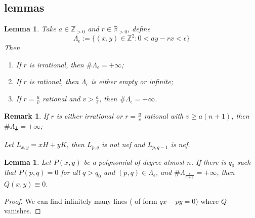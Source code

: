 \documentclass{article}
\newtheorem{lem}[defn]{Lemma}
\newtheorem{rmk}[defn]{Remark}
\begin{document}
\subsection{lemmas}
\begin{lem}
  Take $ a\in \mathbb{Z}_{>0} $ and $ r\in \mathbb{R}_{>0} $, define 
  \[ \Lambda_\epsilon:=\{ (x,y)\in \mathbb{Z}^2 : 0<ay-rx<\epsilon \} \]
  Then 
  \begin{enumerate}
    \item If $ r $ is irrational, then $ \#\Lambda_{\epsilon} =+\infty$;
    \item If $ r $ is rational, then $ \Lambda_{\epsilon} $ is either empty or infinite;
    \item If $ r=\frac{u}{v} $ rational and $ v> \frac{a}{\epsilon} $, then $ \#\Lambda_{\epsilon} =+\infty$.
  \end{enumerate}
\end{lem}
\begin{rmk}
  If $ r $ is either irrational or $ r=\frac{u}{v} $ rational with $ v\geqslant a(n+1) $, then $ \#\Lambda_{\frac{1}{n}}=+\infty $;
  
  Let $ L_{x,y}=xH+yK $, then $ L_{p,q} $ is not nef and $ L_{p,q-1} $ is nef.
\end{rmk}
\begin{lem}
  Let $ P(x,y) $ be a polynomial of degree atmost $ n $. If there is $ q_0 $ such that $ P(p,q)=0 $ for all $ q>q_0 $ and $ (p,q)\in \Lambda_{\epsilon} $, and $ \#\Lambda_{\frac{\epsilon}{n+1}}=+\infty  $, then $ Q(x,y)\equiv 0 $.
\end{lem}
\begin{proof}
  We can find infinitely many lines ( of form $ qx-py=0 $) where $ Q $ vanishes.
\end{proof}
\end{document}
